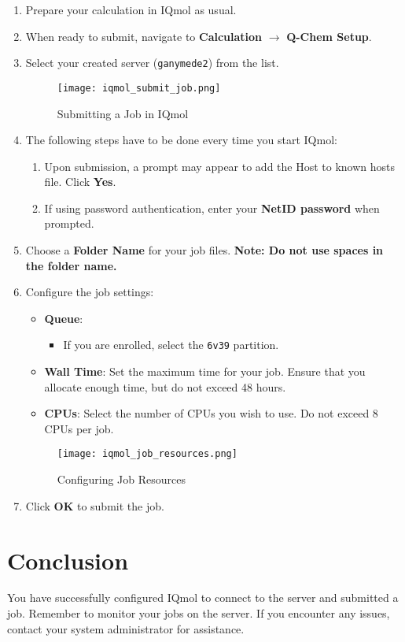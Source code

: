 \documentclass[12pt,letterpaper]{article}
\begin{document}
\begin{enumerate}
    \item Prepare your calculation in IQmol as usual.
    \item When ready to submit, navigate to \textbf{Calculation} $\rightarrow$ \textbf{Q-Chem Setup}.
    \item Select your created server (\texttt{ganymede2}) from the list.

    \begin{figure}[H]
        \centering
        \texttt{[image: iqmol\_submit\_job.png]}
        \caption{Submitting a Job in IQmol}
        \label{fig:iqmol_submit_job}
    \end{figure}

    \item The following steps have to be done every time you start IQmol:
    \begin{enumerate}
        \item Upon submission, a prompt may appear to add the Host to known hosts file. Click \textbf{Yes}.
        \item If using password authentication, enter your \textbf{NetID password} when prompted.
    \end{enumerate}

    \item Choose a \textbf{Folder Name} for your job files. \textbf{Note: Do not use spaces in the folder name.}

    \item Configure the job settings:
    \begin{itemize}
        \item \textbf{Queue}:
        \begin{itemize}
            \item If you are enrolled, select the \texttt{6v39} partition.
        \end{itemize}
        \item \textbf{Wall Time}: Set the maximum time for your job. Ensure that you allocate enough time, but do not exceed 48 hours.
        \item \textbf{CPUs}: Select the number of CPUs you wish to use. Do not exceed 8 CPUs per job.
    \end{itemize}

    \begin{figure}[H]
        \centering
        \texttt{[image: iqmol\_job\_resources.png]}
        \caption{Configuring Job Resources}
        \label{fig:iqmol_job_resources}
    \end{figure}

    \item Click \textbf{OK} to submit the job.
\end{enumerate}

\section{Conclusion}

You have successfully configured IQmol to connect to the server and submitted a job.
Remember to monitor your jobs on the server. If you encounter any issues, contact your system administrator for assistance.
\end{document}
